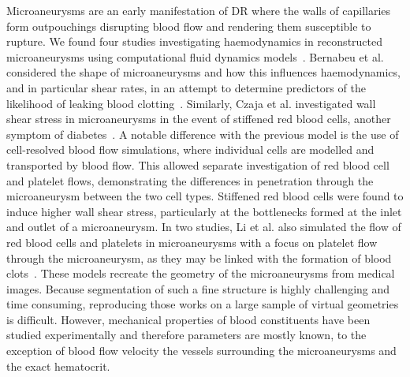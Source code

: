 \documentclass{article}
\begin{document}
Microaneurysms are an early manifestation of DR where the walls of capillaries form outpouchings disrupting blood flow and rendering them susceptible to rupture.
We found four studies investigating haemodynamics in reconstructed microaneurysms using computational fluid dynamics models~\cite{Bernabeu_2018,Czaja_2022,Li_2020,Li_2022}.
Bernabeu et al. considered the shape of microaneurysms and how this influences haemodynamics, and in particular shear rates, in an attempt to determine predictors of the likelihood of leaking blood clotting~\cite{Bernabeu_2018}.
Similarly, Czaja et al. investigated wall shear stress in microaneurysms in the event of stiffened red blood cells, another symptom of diabetes~\cite{Czaja_2022}.
A notable difference with the previous model is the use of cell-resolved blood flow simulations, where individual cells are modelled and transported by blood flow.
This allowed separate investigation of red blood cell and platelet flows, demonstrating the differences in penetration through the microaneurysm between the two cell types.
Stiffened red blood cells were found to induce higher wall shear stress, particularly at the bottlenecks formed at the inlet and outlet of a microaneurysm.
In two studies, Li et al. also simulated the flow of red blood cells and platelets in microaneurysms with a focus on platelet flow through the microaneurysm, as they may be linked with the formation of blood clots~\cite{Li_2020,Li_2022}.
These models recreate the geometry of the microaneurysms from medical images.
Because segmentation of such a fine structure is highly challenging and time consuming, reproducing those works on a large sample of virtual geometries is difficult.
However, mechanical properties of blood constituents have been studied experimentally and therefore parameters are mostly known, to the exception of blood flow velocity the vessels surrounding the microaneurysms and the exact hematocrit.
\end{document}
